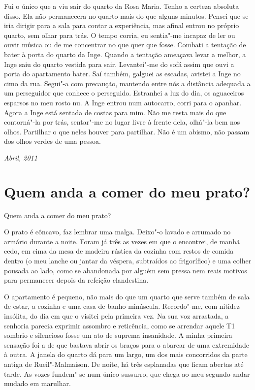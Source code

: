 Fui o único que a viu sair do quarto da Rosa Maria. Tenho a certeza
absoluta disso. Ela não permanecera no quarto mais do que alguns
minutos. Pensei que se iria dirigir para a sala para contar a
experiência, mas afinal entrou no próprio quarto, sem olhar para trás. O
tempo corria, eu sentia"-me incapaz de ler ou ouvir música ou de me
concentrar no que quer que fosse. Combati a tentação de bater à porta do
quarto da Inge. Quando a tentação ameaçava levar a melhor, a Inge saiu
do quarto vestida para sair. Levantei"-me do sofá assim que ouvi a porta
do apartamento bater. Saí também, galguei as escadas, avistei a Inge no
cimo da rua. Segui"-a com precaução, mantendo entre nós a distância
adequada a um perseguidor
que conhece o perseguido. Estranhei a luz do dia, os aguaceiros
esparsos no meu rosto nu. A Inge entrou num autocarro, corri para o
apanhar. Agora a Inge está sentada de costas para mim. Não me resta mais
do que contorná"-la por trás, sentar"-me no lugar livre à frente dela, olhá"-la bem nos olhos. Partilhar o
que neles houver para partilhar. Não é um abismo, não passam dos olhos
verdes de uma pessoa.

\begin{flushright}
\emph{Abril, 2011}
\end{flushright}

\chapter{Quem anda a comer do meu
prato?}

Quem anda a comer do meu prato?

O prato é côncavo, faz lembrar uma malga. Deixo"-o lavado e arrumado no
armário durante a noite. Foram já três as vezes em que o encontrei, de
manhã cedo, em cima da mesa de madeira rústica da cozinha com restos de
comida dentro (o meu lanche ou jantar da véspera, subtraídos ao
frigorífico) e uma colher pousada ao lado, como se abandonada por alguém
sem pressa nem reais motivos para permanecer depois da refeição
clandestina.

O apartamento é pequeno, não mais do que um quarto que serve também de
sala de estar, a cozinha e uma casa de banho minúscula. Recordo"-me, com
nitidez insólita, do dia em que o visitei pela primeira vez. Na sua voz
arrastada, a senhoria parecia exprimir assombro e reticência, como se
arrendar aquele T1 sombrio e silencioso fosse um ato de suprema insanidade. A minha primeira sensação foi a de que bastava abrir os braços
para o abarcar de uma extremidade à outra. A janela do quarto dá para um
largo, um dos mais concorridos da parte antiga de Rueil"-Malmaison. De
noite, há três esplanadas que ficam abertas até tarde. As vozes
fundem"-se num único sussurro, que chega ao meu segundo andar mudado em marulhar.

